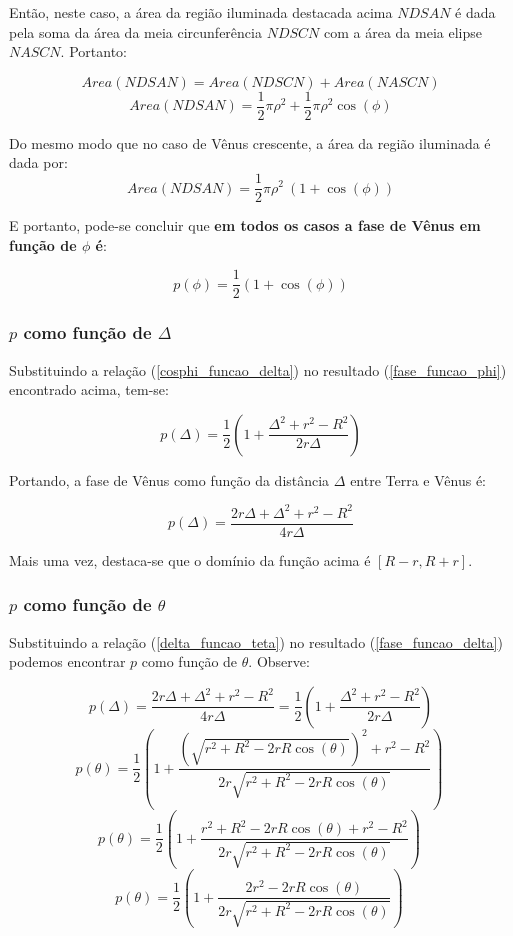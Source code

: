 \documentclass[a4paper, 12pt]{article}
\begin{document}
Então, neste caso, a área da região iluminada destacada acima $NDSAN$ é dada pela soma da área da meia circunferência $NDSCN$ com a área da meia elipse $NASCN$. Portanto:

$$Area\left(NDSAN\right)=Area\left(NDSCN\right)+Area\left(NASCN\right)$$
$$Area\left(NDSAN\right)=\frac{1}{2}\pi \rho ^2+\frac{1}{2}\pi \rho ^2\cos \left(\phi \right)$$

Do mesmo modo que no caso de Vênus crescente, a área da região iluminada é dada por: 
$$Area\left(NDSAN\right)=\frac{1}{2}\pi \rho ^2\ \left(1+\cos \left(\phi \right)\right)$$

E portanto, pode-se concluir que \textbf{em todos os casos a fase de Vênus em função de $\phi$ é}:

\begin{equation}\label{fase_funcao_phi}
    \boxed{p\left(\phi \right)=\frac{1}{2}\left(1+\cos \left(\phi \right)\right)}
\end{equation}

\subsubsection{$p$ como função de $\Delta$}

Substituindo a relação (\ref{cosphi_funcao_delta}) no resultado (\ref{fase_funcao_phi}) encontrado acima, tem-se:

$$p\left(\Delta \right)=\frac{1}{2}\left(1+\frac{\Delta ^2+r^2-R^2}{2r\Delta }\right)$$

Portando, a fase de Vênus como função da distância $\Delta$ entre Terra e Vênus é:

\begin{equation}\label{fase_funcao_delta}
    \boxed{p\left(\Delta \right)=\frac{2r\Delta +\Delta ^2+r^2-R^2}{4r\Delta }}
\end{equation}

Mais uma vez, destaca-se que o domínio da função acima é $\left[R-r{,}R+r\right]$. 

\subsubsection{$p$ como função de $\theta$}

Substituindo a relação (\ref{delta_funcao_teta}) no resultado (\ref{fase_funcao_delta}) podemos encontrar $p$ como função de $\theta$. Observe:

$$p\left(\Delta \right)=\frac{2r\Delta +\Delta ^2+r^2-R^2}{4r\Delta }=\frac{1}{2}\left(1+\frac{\Delta ^2+r^2-R^2}{2r\Delta }\right)$$
$$p\left(\theta \right)=\frac{1}{2}\left(1+\frac{\left(\sqrt{r^2+R^2-2rR\cos \left(\theta \right)}\right)^2+r^2-R^2}{2r \sqrt{r^2+R^2-2rR\cos \left(\theta \right)}}\right)\ $$
$$p\left(\theta \right)=\frac{1}{2}\left(1+\frac{r^2+R^2-2rR\cos \left(\theta \right)+r^2-R^2}{2r\sqrt{r^2+R^2-2rR\cos \left(\theta \right)}}\right)\ $$
$$p\left(\theta \right)=\frac{1}{2}\left(1+\frac{2r^2-2rR\cos \left(\theta \right)}{2r\sqrt{r^2+R^2-2rR\cos \left(\theta \right)}}\right)\ $$
\end{document}
